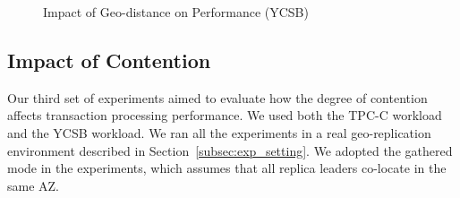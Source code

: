 \documentclass[conference]{IEEEtran}
\begin{document}
\begin{figure}[tbp]
  \centering
      \caption{Impact of Geo-distance on Performance (YCSB) }
      \label{fig:new_order_add_log_cost}
\end{figure}




\subsection{Impact of Contention}

Our third set of experiments aimed to evaluate how the degree of contention affects transaction processing performance.
We used both the TPC-C workload and the YCSB workload.
We ran all the experiments in a real geo-replication environment described in Section~\ref{subsec:exp_setting}.
We adopted the gathered mode in the experiments, which assumes that all replica leaders co-locate in the same AZ.
\end{document}
